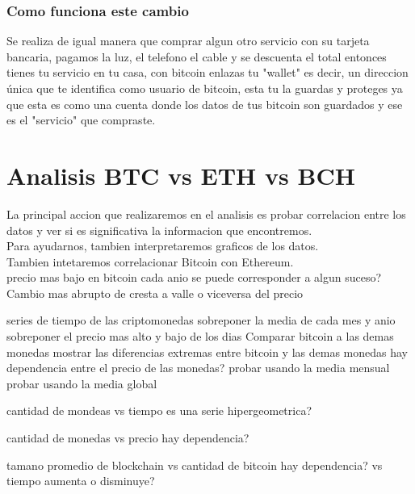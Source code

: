 \documentclass[12pt,letterpaper]{article}
\begin{document}
		\subsubsection*{Como funciona este cambio}
        Se realiza de igual manera que comprar algun otro servicio con su tarjeta bancaria, pagamos la luz, el telefono el cable y se descuenta el total entonces tienes tu servicio en tu casa, con bitcoin enlazas tu "wallet" es decir, un direccion \'unica que te identifica como usuario de bitcoin, esta tu la guardas y proteges ya que esta es como una cuenta donde los datos de tus bitcoin son guardados y ese es el "servicio" que compraste.
        

\section*{Analisis BTC vs ETH vs BCH}
    La principal accion que realizaremos en el analisis es probar correlacion entre los datos y ver si es significativa la informacion que encontremos.
    \\
    Para ayudarnos, tambien interpretaremos graficos de los datos.
    \\
    Tambien intetaremos correlacionar Bitcoin con Ethereum.
    \\
    precio mas bajo en bitcoin cada anio
        se puede corresponder a algun suceso?
    Cambio mas abrupto de cresta a valle o viceversa del precio

    series de tiempo de las criptomonedas
        sobreponer la media de cada mes y anio
    sobreponer el precio mas alto y bajo de los dias
    Comparar bitcoin a las demas monedas
        mostrar las diferencias extremas entre bitcoin y las demas monedas
    hay dependencia entre el precio de las monedas?
        probar usando la media mensual
        probar usando la media global

    cantidad de mondeas vs tiempo
        es una serie hipergeometrica?

    cantidad de monedas vs precio
        hay dependencia?

    tamano promedio de blockchain
        vs cantidad de bitcoin
            hay dependencia?
        vs tiempo
            aumenta o disminuye?
\end{document}

